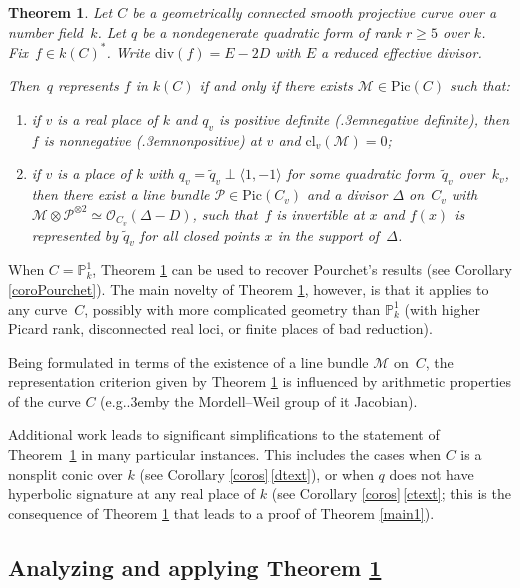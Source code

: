 \documentclass{amsart}
\newtheorem{thm}{Theorem}[section]
\theoremstyle{definition}
\theoremstyle{remark}
\numberwithin{equation}{section}
\newcommand{\cl}{\mathrm{cl}}
\newcommand{\Pic}{\mathrm{Pic}}
\newcommand{\ddiv}{\mathrm{div}}
\def\eg{e.g.\kern.3em}
\def\resp {\text{resp.}\kern.3em}
\def\P{\mathbb P}
\def\cM{\mathcal{M}}
\def\cO{\mathcal{O}}
\def\cM{\mathcal{M}}
\def\cP{\mathcal{P}}
\def\tq{\tilde{q}}
\begin{document}
\begin{thm}
\label{main2}
Let $C$ be a geometrically connected smooth projective curve over a number field~$k$. Let $q$ be a nondegenerate quadratic form of rank $r\geq 5$ over $k$. Fix~$f\in k(C)^*$. Write $\ddiv(f)=E-2D$ with $E$ a reduced effective divisor. 

Then~$q$ represents $f$ in $k(C)$ if and only if there exists $\cM\in\Pic(C)$
such that:
\begin{enumerate}[label=(\roman*)] 
\item
\label{intro}
 if $v$ is a real place of $k$ and $q_v$ is positive definite (\resp negative definite), then $f$ is nonnegative  (\resp nonpositive) at $v$ and $\cl_v(\cM)=0$;
 \item
 \label{iintro}
if $v$ is a place of $k$ with $q_v=\tilde{q}_v\perp\langle 1,-1\rangle$ for some quadratic form~$\tq_v$ over~$k_v$, then
there exist a line bundle $\cP\in\Pic(C_v)$ and a divisor $\Delta$ on~$C_v$ with ${\cM\otimes\cP^{\otimes 2}\simeq\cO_{C_v}(\Delta-D)}$, such that~$f$ is invertible at $x$ and $f(x)$ is represented by $\tilde{q}_v$ for all closed points $x$ in the support of~$\Delta$.
\end{enumerate}
\end{thm}

When $C=\P^1_k$, Theorem \ref{main2} can be used to recover Pourchet's results \cite[Corollaire~1~p.\,98]{Pourchet} (see Corollary \ref{coroPourchet}).
The main novelty of Theorem \ref{main2}, however, 
is that it applies to any curve~$C$, possibly with more complicated geometry than $\P^1_k$ (with higher Picard rank, disconnected real loci, or finite places of bad reduction). 

Being formulated in terms of the existence of a line bundle $\cM$ on~$C$, the representation criterion given by Theorem \ref{main2} is influenced by arithmetic properties of the curve $C$ (\eg by the Mordell--Weil group of it Jacobian).

Additional work leads to significant simplifications to the statement of Theorem~\ref{main2} in many particular instances.
 This includes the cases when $C$ is a nonsplit conic over $k$ (see Corollary \ref{coros}\,\ref{dtext}), or when $q$ does not have hyperbolic signature at any real place of $k$ (see Corollary \ref{coros}\,\ref{ctext}; this is the consequence of Theorem \ref{main2} that leads to a proof of Theorem \ref{main1}).


\subsection{Analyzing and applying Theorem \ref{main2}}
\end{document}
